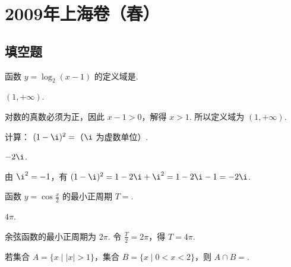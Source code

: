 \chapter{2009年上海卷（春）}

\section{填空题}

\begin{problem}

函数 \( y=\log_{2}(x-1) \) 的定义域是\fillinblank{}.
\end{problem}

\begin{answer}
\((1,+\infty)\).
\end{answer}

\begin{solution}
对数的真数必须为正，因此 \(x-1>0\)，解得 \(x>1\). 所以定义域为 \((1,+\infty)\).
\end{solution}

\begin{problem}

计算： \( (1-\i)^{2}= \)\fillinblank{}（\(\i\) 为虚数单位）.
\end{problem}

\begin{answer}
\(-2\i\).
\end{answer}

\begin{solution}
由 \(\i^{2}=-1\)，有 \((1-\i)^2=1-2\i+\i^2=1-2\i-1=-2\i\).
\end{solution}

\begin{problem}

函数 \( y = \cos \frac{x}{2} \) 的最小正周期 \(T=\)\fillinblank{}.
\end{problem}

\begin{answer}
\(4\pi\).
\end{answer}

\begin{solution}
余弦函数的最小正周期为 \(2\pi\). 令 \(\frac{T}{2}=2\pi\)，得 \(T=4\pi\).
\end{solution}

\begin{problem}

若集合 \( A = \{x \mid |x| > 1\} \)，集合 \( B = \{x \mid 0 < x < 2\} \)，则 \( A \cap B = \)\fillinblank{}.
\end{problem}

